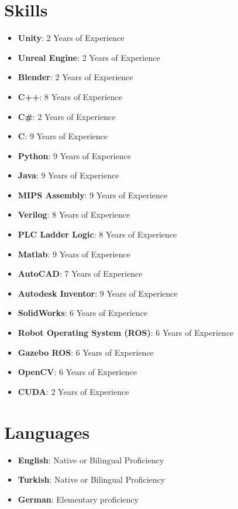 \documentclass[letterpaper,11pt]{article}
\newcommand{\resumeItem}[1]{
  \item\small{
    {#1 \vspace{-2pt}}
  }
}
\newcommand{\resumeSkillExperience}[2]{
  \item \small{\textbf{#1}: #2} \vspace{-10pt}
}
\newcommand{\resumeLanguage}[2]{
  \item
    \textbf{#1}: #2 \vspace{-10pt}
}
\newcommand{\resumeSubHeadingListStart}{\begin{itemize}[leftmargin=0.0in, label={}]}
\newcommand{\resumeSubHeadingListEnd}{\end{itemize}}
\newcommand{\resumeItemListStart}{\begin{itemize}}
\begin{document}
\section{Skills}
\begin{itemize}[leftmargin=0.15in, label={}]
  \resumeSkillExperience{Unity}{2 Years of Experience}
  \resumeSkillExperience{Unreal Engine}{2 Years of Experience}
  \resumeSkillExperience{Blender}{2 Years of Experience}
  \resumeSkillExperience{C++}{8 Years of Experience}
  \resumeSkillExperience{C\#}{2 Years of Experience}
  \resumeSkillExperience{C}{9 Years of Experience}
  \resumeSkillExperience{Python}{9 Years of Experience}
  \resumeSkillExperience{Java}{9 Years of Experience}
  \resumeSkillExperience{MIPS Assembly}{9 Years of Experience}
  \resumeSkillExperience{Verilog}{8 Years of Experience}
  \resumeSkillExperience{PLC Ladder Logic}{8 Years of Experience}
  \resumeSkillExperience{Matlab}{9 Years of Experience}
  \resumeSkillExperience{AutoCAD}{7 Years of Experience}
  \resumeSkillExperience{Autodesk Inventor}{9 Years of Experience}
  \resumeSkillExperience{SolidWorks}{6 Years of Experience}
  \resumeSkillExperience{Robot Operating System (ROS)}{6 Years of Experience}
  \resumeSkillExperience{Gazebo ROS}{6 Years of Experience}
  \resumeSkillExperience{OpenCV}{6 Years of Experience}
  \resumeSkillExperience{CUDA}{2 Years of Experience}
\end{itemize}
\vspace{-10pt}

\section{Languages}
  \resumeSubHeadingListStart
    \resumeLanguage
      {English}{Native or Bilingual Proficiency}
    \resumeLanguage
      {Turkish}{Native or Bilingual Proficiency}
    \resumeLanguage
      {German}{Elementary proficiency}
  \resumeSubHeadingListEnd
\vspace{-10pt}

            
\end{document}
